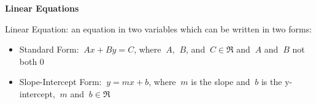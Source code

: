 \begin{center}
\textbf{Linear Equations 
}
\end{center}

\vspce

Linear Equation: an equation in two variables which can be written in two forms: 
\begin{itemize} 
\item Standard Form: $\ {Ax+By=C }$, where $\ { A}$, $\ { B}$, and $\ { C \in \Re}$ and $\ { A}$ and $\ { B}$ not both 0
\item Slope-Intercept Form: $\ {y=mx+b }$, where $\ { m}$ is the slope and $\ {b }$ is the y-intercept, $\ { m}$ and $\ { b \in\Re}$ 
\end{itemize} 

